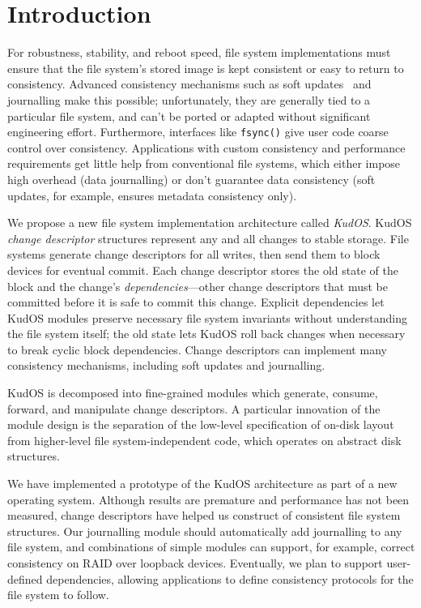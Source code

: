 
\section*{Introduction}
\label{sec:intro}

For robustness, stability, and reboot speed, file system implementations
must ensure that the file system's stored image is kept consistent
or easy to return to consistency.
%
Advanced consistency mechanisms such as soft updates~\cite{ganger00soft}
and journalling make this possible; unfortunately,
%
they are generally tied to a particular file system, and
can't be ported or adapted without significant engineering
effort.
%
Furthermore, interfaces like \verb+fsync()+ give user code coarse control
over consistency.
%
Applications with custom consistency and performance requirements get
little help from conventional file systems, which either impose high
overhead (data journalling) or don't guarantee data consistency (soft
updates, for example, ensures metadata consistency only).



We propose a new file system implementation architecture called
\emph{KudOS}.
%
KudOS \emph{change descriptor} structures represent any and all changes to
stable storage.
%
File systems generate change descriptors for all writes, then
send them to block devices for eventual commit.
%
Each change descriptor stores the old state of the block and the change's
\emph{dependencies}---other change descriptors that must be committed before
it is safe to commit this change.
%
Explicit dependencies let KudOS modules preserve necessary file system
invariants without understanding the file system itself; the old state
lets KudOS roll back changes when necessary to break cyclic block dependencies.
%
Change descriptors can implement many
consistency mechanisms, including soft updates and journalling.

KudOS is decomposed into fine-grained modules which generate, consume,
forward, and manipulate change descriptors. A particular innovation of the
module design is the separation of the low-level specification of on-disk layout
from higher-level file system-independent code, which operates on abstract disk
structures.

We have implemented a prototype of the KudOS
architecture as part of a new operating system.
%
Although results are premature and performance has not been measured,
change descriptors have helped us construct of consistent file
system structures.
%
Our journalling module should automatically add journalling to any file
system, and combinations of simple modules can support, for example,
correct consistency on RAID over loopback devices.
%
Eventually, we plan to support user-defined dependencies,
allowing applications to define consistency protocols for the file system
to follow.


